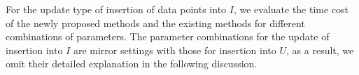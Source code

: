 
For the update type of insertion of data points into $I$, we evaluate the time cost of the newly proposed methods and the existing methods for different combinations of parameters. The parameter combinations for the update of insertion into $I$ are mirror settings with those for insertion into $U$, as a result, we omit their detailed explanation in the following discussion.  

